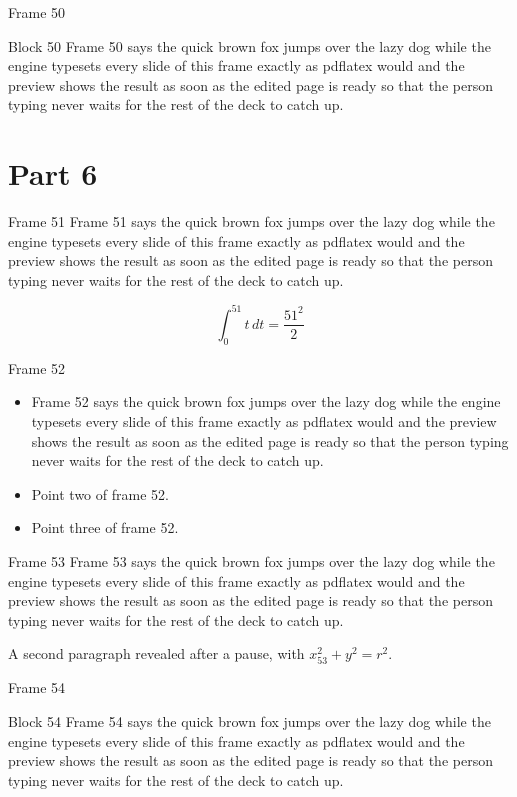 \documentclass{beamer}
\begin{document}
\begin{frame}{Frame 50}
  \begin{block}{Block 50}
    Frame 50 says the quick brown fox jumps over the lazy dog while the engine typesets every slide of this frame exactly as pdflatex would and the preview shows the result as soon as the edited page is ready so that the person typing never waits for the rest of the deck to catch up.
  \end{block}
\end{frame}
\section{Part 6}
\begin{frame}{Frame 51}
  Frame 51 says the quick brown fox jumps over the lazy dog while the engine typesets every slide of this frame exactly as pdflatex would and the preview shows the result as soon as the edited page is ready so that the person typing never waits for the rest of the deck to catch up.

  \[ \int_0^{51} t\,dt = \frac{51^2}{2} \]
\end{frame}
\begin{frame}{Frame 52}
  \begin{itemize}
    \item<1-> Frame 52 says the quick brown fox jumps over the lazy dog while the engine typesets every slide of this frame exactly as pdflatex would and the preview shows the result as soon as the edited page is ready so that the person typing never waits for the rest of the deck to catch up.
    \item<2-> Point two of frame 52.
    \item<3-> Point three of frame 52.
  \end{itemize}
\end{frame}
\begin{frame}{Frame 53}
  Frame 53 says the quick brown fox jumps over the lazy dog while the engine typesets every slide of this frame exactly as pdflatex would and the preview shows the result as soon as the edited page is ready so that the person typing never waits for the rest of the deck to catch up.
  \pause

  A second paragraph revealed after a pause, with $x_{53}^2 + y^2 = r^2$.
\end{frame}
\begin{frame}{Frame 54}
  \begin{block}{Block 54}
    Frame 54 says the quick brown fox jumps over the lazy dog while the engine typesets every slide of this frame exactly as pdflatex would and the preview shows the result as soon as the edited page is ready so that the person typing never waits for the rest of the deck to catch up.
  \end{block}
\end{frame}
\end{document}
